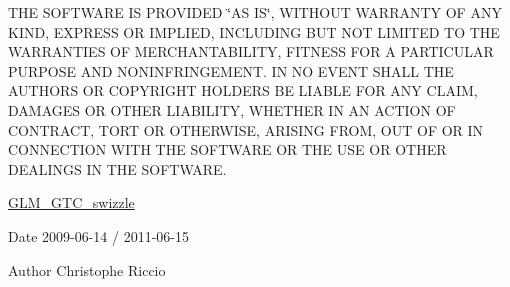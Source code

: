 T\+H\+E S\+O\+F\+T\+W\+A\+R\+E I\+S P\+R\+O\+V\+I\+D\+E\+D \char`\"{}\+A\+S I\+S\char`\"{}, W\+I\+T\+H\+O\+U\+T W\+A\+R\+R\+A\+N\+T\+Y O\+F A\+N\+Y K\+I\+N\+D, E\+X\+P\+R\+E\+S\+S O\+R I\+M\+P\+L\+I\+E\+D, I\+N\+C\+L\+U\+D\+I\+N\+G B\+U\+T N\+O\+T L\+I\+M\+I\+T\+E\+D T\+O T\+H\+E W\+A\+R\+R\+A\+N\+T\+I\+E\+S O\+F M\+E\+R\+C\+H\+A\+N\+T\+A\+B\+I\+L\+I\+T\+Y, F\+I\+T\+N\+E\+S\+S F\+O\+R A P\+A\+R\+T\+I\+C\+U\+L\+A\+R P\+U\+R\+P\+O\+S\+E A\+N\+D N\+O\+N\+I\+N\+F\+R\+I\+N\+G\+E\+M\+E\+N\+T. I\+N N\+O E\+V\+E\+N\+T S\+H\+A\+L\+L T\+H\+E A\+U\+T\+H\+O\+R\+S O\+R C\+O\+P\+Y\+R\+I\+G\+H\+T H\+O\+L\+D\+E\+R\+S B\+E L\+I\+A\+B\+L\+E F\+O\+R A\+N\+Y C\+L\+A\+I\+M, D\+A\+M\+A\+G\+E\+S O\+R O\+T\+H\+E\+R L\+I\+A\+B\+I\+L\+I\+T\+Y, W\+H\+E\+T\+H\+E\+R I\+N A\+N A\+C\+T\+I\+O\+N O\+F C\+O\+N\+T\+R\+A\+C\+T, T\+O\+R\+T O\+R O\+T\+H\+E\+R\+W\+I\+S\+E, A\+R\+I\+S\+I\+N\+G F\+R\+O\+M, O\+U\+T O\+F O\+R I\+N C\+O\+N\+N\+E\+C\+T\+I\+O\+N W\+I\+T\+H T\+H\+E S\+O\+F\+T\+W\+A\+R\+E O\+R T\+H\+E U\+S\+E O\+R O\+T\+H\+E\+R D\+E\+A\+L\+I\+N\+G\+S I\+N T\+H\+E S\+O\+F\+T\+W\+A\+R\+E.

\hyperlink{group__gtc__swizzle}{G\+L\+M\+\_\+\+G\+T\+C\+\_\+swizzle}

\begin{DoxyDate}{Date}
2009-\/06-\/14 / 2011-\/06-\/15 
\end{DoxyDate}
\begin{DoxyAuthor}{Author}
Christophe Riccio 
\end{DoxyAuthor}
